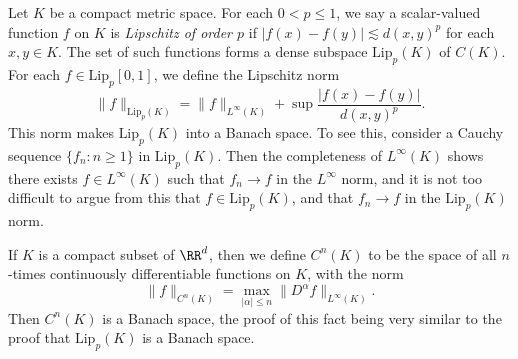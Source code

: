 \begin{example}
    Let $K$ be a compact metric space. For each $0 < p \leq 1$, we say a scalar-valued function $f$ on $K$ is {\it Lipschitz of order $p$} if $|f(x) - f(y)| \lesssim d(x,y)^p$ for each $x,y \in K$. The set of such functions forms a dense subspace $\text{Lip}_p(K)$ of $C(K)$. For each $f \in \text{Lip}_p [0,1]$, we define the Lipschitz norm
    \[ \| f \|_{\text{Lip}_p(K)} = \| f \|_{L^\infty(K)} + \sup \frac{|f(x) - f(y)|}{d(x,y)^p}. \]
    This norm makes $\text{Lip}_p(K)$ into a Banach space. To see this, consider a Cauchy sequence $\{ f_n : n \geq 1 \}$ in $\text{Lip}_p(K)$. Then the completeness of $L^\infty(K)$ shows there exists $f \in L^\infty(K)$ such that $f_n \to f$ in the $L^\infty$ norm, and it is not too difficult to argue from this that $f \in \text{Lip}_p(K)$, and that $f_n \to f$ in the $\text{Lip}_p(K)$ norm.
\end{example}

\begin{example}
    If $K$ is a compact subset of $\RR^d$, then we define $C^n(K)$ to be the space of all $n$-times continuously differentiable functions on $K$, with the norm
    \[ \| f \|_{C^n(K)} = \max_{|\alpha| \leq n} \| D^\alpha f \|_{L^\infty(K)}. \]
    Then $C^n(K)$ is a Banach space, the proof of this fact being very similar to the proof that $\text{Lip}_p(K)$ is a Banach space.
\end{example}

